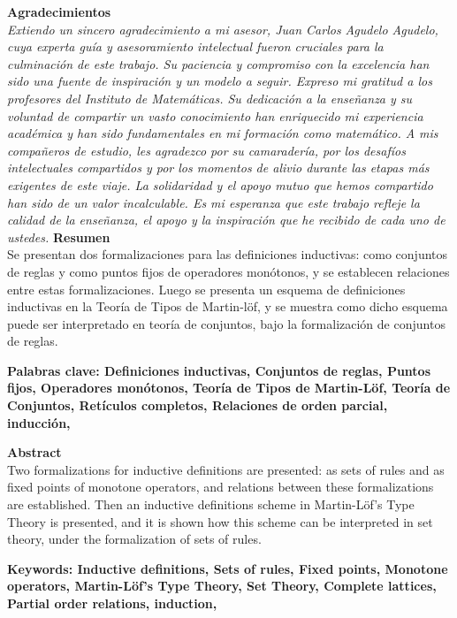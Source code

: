 \documentclass[11pt,oneside]{report}
\theoremstyle{plain}
\theoremstyle{definition}
\begin{document}
\newpage
\centering
{\LARGE \textbf{Agradecimientos}} \\[1.5cm]
\thispagestyle{empty}
\justifying
\textit{
Extiendo un sincero agradecimiento a mi asesor, Juan Carlos Agudelo Agudelo, cuya experta guía y asesoramiento intelectual fueron cruciales para la culminación de este trabajo. Su paciencia y compromiso con la excelencia han sido una fuente de inspiración y un modelo a seguir.
Expreso mi gratitud a los profesores del Instituto de Matemáticas. Su dedicación a la enseñanza y su voluntad de compartir un vasto conocimiento han enriquecido mi experiencia académica y han sido fundamentales en mi formación como matemático.
A mis compañeros de estudio, les agradezco por su camaradería, por los desafíos intelectuales compartidos y por los momentos de alivio durante las etapas más exigentes de este viaje. La solidaridad y el apoyo mutuo que hemos compartido han sido de un valor incalculable.
Es mi esperanza que este trabajo refleje la calidad de la enseñanza, el apoyo y la inspiración que he recibido de cada uno de ustedes.
}
\newpage
\null
\thispagestyle{empty}
\newpage
\thispagestyle{empty}
{\Huge \textbf{Resumen}}\\
Se presentan dos formalizaciones para las definiciones inductivas:
como conjuntos de reglas y como puntos fijos de operadores monótonos, y se
establecen relaciones entre estas formalizaciones. Luego se presenta un
esquema de definiciones inductivas en la Teoría de Tipos de Martin-löf, y se
muestra como dicho esquema puede ser interpretado en teoría de conjuntos,
bajo la formalización de conjuntos de reglas.

\vspace{2cm}
{\textbf{Palabras clave: Definiciones inductivas, Conjuntos de reglas, Puntos fijos, Operadores monótonos, Teoría de Tipos de Martin-Löf, Teoría de Conjuntos, Retículos completos, Relaciones de orden parcial, inducción, 
}}

\vspace{2cm}
{\Huge \textbf{Abstract}}\\
Two formalizations for inductive definitions are presented: as sets of rules and as fixed points of monotone operators, and relations between these formalizations are established. Then an inductive definitions scheme in Martin-Löf's Type Theory is presented, and it is shown how this scheme can be interpreted in set theory, under the formalization of sets of rules.

\vspace{2cm}
{\textbf{Keywords: Inductive definitions, Sets of rules, Fixed points, Monotone operators, Martin-Löf's Type Theory, Set Theory, Complete lattices, Partial order relations, induction, 
}}
\end{document}
